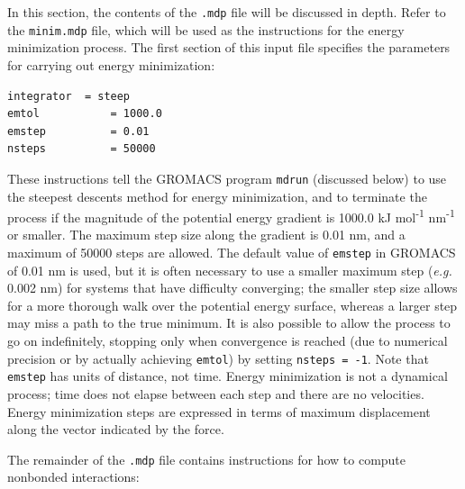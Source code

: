 \documentclass[9pt,tutorial,pubversion]{livecoms}
\begin{document}
In this section, the contents of the \texttt{.mdp} file will be discussed in depth. Refer to the \texttt{minim.mdp} file, which will be used as the instructions for the energy minimization process. The first section of this input file specifies the parameters for carrying out energy minimization:

\begin{lstlisting}
integrator	= steep
emtol           = 1000.0
emstep          = 0.01
nsteps          = 50000
\end{lstlisting}
%
These instructions tell the GROMACS program \texttt{mdrun} (discussed below) to use the steepest descents method for energy minimization, and to terminate the process if the magnitude of the potential energy gradient is 1000.0 kJ mol\textsuperscript{-1} nm\textsuperscript{-1} or smaller. The maximum step size along the gradient is 0.01 nm, and a maximum of 50000 steps are allowed. The default value of \texttt{emstep} in GROMACS of 0.01 nm is used, but it is often necessary to use a smaller maximum step ({\em e.g.} 0.002 nm) for systems that have difficulty converging; the smaller step size allows for a more thorough walk over the potential energy surface, whereas a larger step may miss a path to the true minimum. It is also possible to allow the process to go on indefinitely, stopping only when convergence is reached (due to numerical precision or by actually achieving \texttt{emtol}) by setting \texttt{nsteps = -1}. Note that \texttt{emstep} has units of distance, not time. Energy minimization is not a dynamical process; time does not elapse between each step and there are no velocities. Energy minimization steps are expressed in terms of maximum displacement along the vector indicated by the force.

The remainder of the \texttt{.mdp} file contains instructions for how to compute nonbonded interactions:
\end{document}
